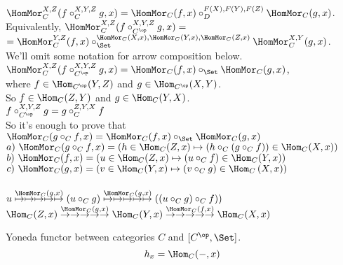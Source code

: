 \documentclass[10pt,a4paper]{article}
\begin{document}
\begin{enumerate}
$\HomMor_C^{X,Z}(f\circ_C^{X,Y,Z} g, x)=\HomMor_C(f,x)\circ_D^{F(X),F(Y),F(Z)} \HomMor_C(g,x)$.\\
Equivalently, $\HomMor_C^{X,Z}(f\circ_{C^\op}^{X,Y,Z} g, x)=$\\ $=\HomMor_C^{Y,Z}(f,x)\circ_\Set^{\HomMor_C(X,x),\HomMor_C(Y,x),\HomMor_C(Z,x)} \HomMor_C^{X,Y}(g,x)$.\\
We'll omit some notation for arrow composition below.\\
$\HomMor_C^{X,Z}(f\circ_{C^\op}^{X,Y,Z} g, x)=\HomMor_C(f,x)\circ_\Set \HomMor_C(g,x)$,\\
where $f\in\Hom_{C^\op}(Y,Z)$ and $g\in\Hom_{C^\op}(X,Y)$.\\
So $f\in\Hom_{C}(Z,Y)$ and $g\in\Hom_{C}(Y,X)$.\\
$f\circ_{C^\op}^{X,Y,Z} g = g\circ_{C}^{Z,Y,X} f$\\
So it's enough to prove that $\HomMor_C(g\circ_C f, x) = \HomMor_C(f, x) \circ_\Set \HomMor_C(g, x)$\\
$a)\ \HomMor_C(g\circ_C f, x) = (h \in\Hom_C(Z,x) \mapsto (h \circ_C (g\circ_C f))\in\Hom_C(X,x))$\\
$b)\ \HomMor_C(f, x) = \left(u \in\Hom_C(Z,x) \mapsto (u \circ_C f)\in\Hom_C(Y,x)\right)$\\
$c)\ \HomMor_C(g, x) = \left(v \in\Hom_C(Y,x) \mapsto (v \circ_C g)\in\Hom_C\left(X,x\right)\right)$\\
\\
$u \stackrel{\HomMor_C(g, x)}{\mapsto\mapsto\mapsto\mapsto\mapsto} (u \circ_C g)\stackrel{\HomMor_C(g, x)}{\mapsto\mapsto\mapsto\mapsto\mapsto} ((u \circ_C g) \circ_C f))$
\\
$\Hom_C(Z,x) \stackrel{\HomMor_C(g, x)}{\to\to\to\to\to} \Hom_C(Y,x)\stackrel{\HomMor_C(f, x)}{\to\to\to\to\to} \Hom_C(X,x)$
\\
\end{enumerate}
\myqed
\begin{definition}
Yoneda functor between categories $C$ and $[C^\op,\Set]$.
$$h_x = \Hom_C(-, x)$$
\end{definition}
\end{document}
